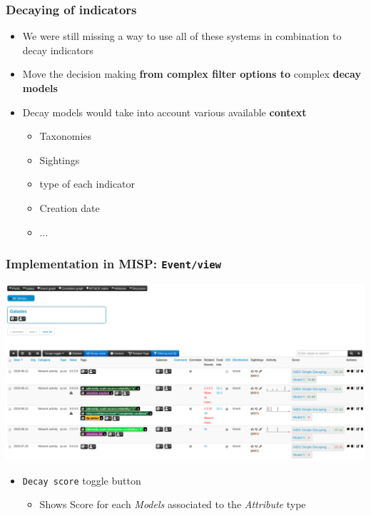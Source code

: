 \begin{frame}
  \frametitle{Decaying of indicators}
  \begin{itemize}
    \item We were still missing a way to use all of these systems in combination to decay indicators
    \item Move the decision making \textbf{from complex filter options to} complex \textbf{decay models}
    \item Decay models would take into account various available {\bf context}
    \begin{itemize}
      \item Taxonomies
      \item Sightings
      \item type of each indicator
      \item Creation date
      \item ...
    \end{itemize}
  \end{itemize}
\end{frame}

\begin{frame}
    \frametitle{Implementation in MISP: \texttt{Event/view}}
    \includegraphics[width=1.00\linewidth]{decaying-event.png}
    \begin{itemize}
        \item \texttt{Decay score} toggle button
        \begin{itemize}
            \item Shows Score for each \textit{Models} associated to the \textit{Attribute} type
        \end{itemize}
    \end{itemize}
\end{frame}


